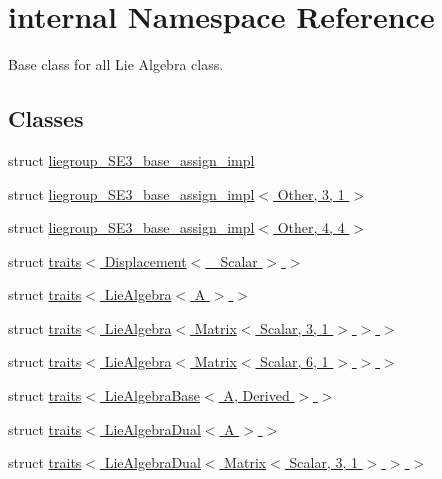 \hypertarget{namespaceinternal}{}\section{internal Namespace Reference}
\label{namespaceinternal}


Base class for all Lie Algebra class.  


\subsection*{Classes}
\begin{DoxyCompactItemize}
\item 
struct \hyperlink{structinternal_1_1liegroup___s_e3__base__assign__impl}{liegroup\+\_\+\+S\+E3\+\_\+base\+\_\+assign\+\_\+impl}
\item 
struct \hyperlink{structinternal_1_1liegroup___s_e3__base__assign__impl_3_01_other_00_013_00_011_01_4}{liegroup\+\_\+\+S\+E3\+\_\+base\+\_\+assign\+\_\+impl$<$ Other, 3, 1 $>$}
\item 
struct \hyperlink{structinternal_1_1liegroup___s_e3__base__assign__impl_3_01_other_00_014_00_014_01_4}{liegroup\+\_\+\+S\+E3\+\_\+base\+\_\+assign\+\_\+impl$<$ Other, 4, 4 $>$}
\item 
struct \hyperlink{structinternal_1_1traits_3_01_displacement_3_01___scalar_01_4_01_4}{traits$<$ Displacement$<$ \+\_\+\+Scalar $>$ $>$}
\item 
struct \hyperlink{structinternal_1_1traits_3_01_lie_algebra_3_01_a_01_4_01_4}{traits$<$ Lie\+Algebra$<$ A $>$ $>$}
\item 
struct \hyperlink{structinternal_1_1traits_3_01_lie_algebra_3_01_matrix_3_01_scalar_00_013_00_011_01_4_01_4_01_4}{traits$<$ Lie\+Algebra$<$ Matrix$<$ Scalar, 3, 1 $>$ $>$ $>$}
\item 
struct \hyperlink{structinternal_1_1traits_3_01_lie_algebra_3_01_matrix_3_01_scalar_00_016_00_011_01_4_01_4_01_4}{traits$<$ Lie\+Algebra$<$ Matrix$<$ Scalar, 6, 1 $>$ $>$ $>$}
\item 
struct \hyperlink{structinternal_1_1traits_3_01_lie_algebra_base_3_01_a_00_01_derived_01_4_01_4}{traits$<$ Lie\+Algebra\+Base$<$ A, Derived $>$ $>$}
\item 
struct \hyperlink{structinternal_1_1traits_3_01_lie_algebra_dual_3_01_a_01_4_01_4}{traits$<$ Lie\+Algebra\+Dual$<$ A $>$ $>$}
\item 
struct \hyperlink{structinternal_1_1traits_3_01_lie_algebra_dual_3_01_matrix_3_01_scalar_00_013_00_011_01_4_01_4_01_4}{traits$<$ Lie\+Algebra\+Dual$<$ Matrix$<$ Scalar, 3, 1 $>$ $>$ $>$}

\end{DoxyCompactItemize}
